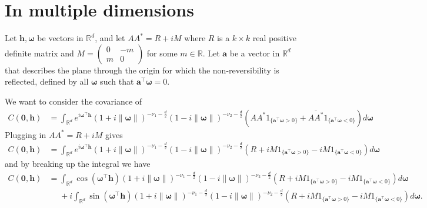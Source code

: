 \documentclass[11pt]{article}
\newcommand{\vlen}{\boldsymbol{h}}
\newcommand{\vint}{\boldsymbol{\omega}}
\newcommand{\vpla}{\boldsymbol{a}}
\begin{document}
\pagebreak
\section{In multiple dimensions}

Let $ \vlen, \vint$ be vectors in $\mathbb{R}^d$, and let $AA^* = R + iM$ where $R$ is a $k\times k$ real positive definite matrix and $M = \begin{pmatrix} 0 & -m\\  m & 0\end{pmatrix}$ for some $m \in \mathbb{R}$. Let $\vpla$ be a vector in $\mathbb{R}^d$ that describes the plane through the origin for which the non-reversibility is reflected, defined by all $\vint$ such that $\vpla^\top \vint = 0$.

We want to consider the covariance of \begin{align*}
C(\boldsymbol{0}, \boldsymbol{h}) &= \int_{\mathbb{R}^d} e^{i \vint^\top \vlen} (1 + i \left\lVert \vint \right\rVert )^{-\nu_1- \frac{d}{2}}(1 - i \left\lVert \vint \right\rVert )^{-\nu_2- \frac{d}{2}} \left(AA^* 1_{\{\vpla^\top \vint > 0\}} + \overline{AA^*} 1_{\{\vpla^\top\vint < 0\}}\right) d\vint%
\end{align*}
Plugging in $AA^* = R + iM$ gives
\begin{align*}
C(\boldsymbol{0}, \boldsymbol{h})&=\int_{\mathbb{R}^d} e^{i \vint^\top \boldsymbol{h}} (1 + i \left\lVert \vint \right\rVert )^{-\nu_1- \frac{d}{2}}(1 - i \left\lVert \vint \right\rVert )^{-\nu_2- \frac{d}{2}} \left(R + iM1_{\{\vpla^\top\vint > 0\}}  - iM1_{\{\vpla^\top\vint < 0\}}\right) d\vint\end{align*}
and by breaking up the integral we have
\begin{align*}
C(\boldsymbol{0}, \boldsymbol{h})%
&=\int_{\mathbb{R}^d}\cos(\vint^\top \boldsymbol{h}) (1 + i \left\lVert \vint \right\rVert )^{-\nu_1- \frac{d}{2}}(1 - i \left\lVert \vint \right\rVert )^{-\nu_2- \frac{d}{2}}\left(R + iM1_{\{\vpla^\top\vint > 0\}}  - iM1_{\{\vpla^\top\vint < 0\}}\right) d\vint \\
&\ \ \ \ \ \ +i\int_{\mathbb{R}^d}\sin(\vint^\top \boldsymbol{h}) (1 + i \left\lVert \vint \right\rVert )^{-\nu_1- \frac{d}{2}}(1 - i \left\lVert \vint \right\rVert )^{-\nu_2- \frac{d}{2}} \left(R + iM1_{\{\vpla^\top\vint > 0\}}  - iM1_{\{\vpla^\top\vint < 0\}}\right) d\vint.\end{align*}
\end{document}
